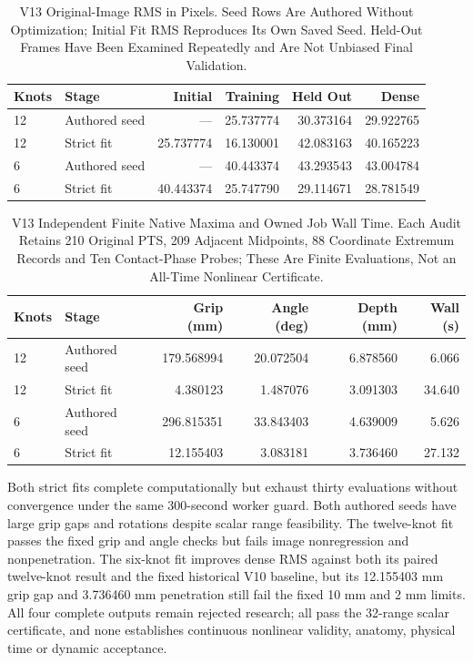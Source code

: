 \documentclass[11pt,letterpaper]{article}
\begin{document}
\begin{table}[ht]\centering\small
\begin{tabular}{@{}llrrrr@{}}
\toprule Knots & Stage & Initial & Training & Held Out & Dense\\\midrule
12 & Authored seed & --- & 25.737774 & 30.373164 & 29.922765\\
12 & Strict fit & 25.737774 & 16.130001 & 42.083163 & 40.165223\\
6 & Authored seed & --- & 40.443374 & 43.293543 & 43.004784\\
6 & Strict fit & 40.443374 & 25.747790 & 29.114671 & 28.781549\\
\bottomrule
\end{tabular}
\caption{V13 Original-Image RMS in Pixels. Seed Rows Are Authored Without
Optimization; Initial Fit RMS Reproduces Its Own Saved Seed. Held-Out Frames
Have Been Examined Repeatedly and Are Not Unbiased Final Validation.}
\end{table}

\begin{table}[ht]\centering\small
\begin{tabular}{@{}llrrrr@{}}
\toprule Knots & Stage & Grip (mm) & Angle (deg) & Depth (mm) & Wall (s)\\\midrule
12 & Authored seed & 179.568994 & 20.072504 & 6.878560 & 6.066\\
12 & Strict fit & 4.380123 & 1.487076 & 3.091303 & 34.640\\
6 & Authored seed & 296.815351 & 33.843403 & 4.639009 & 5.626\\
6 & Strict fit & 12.155403 & 3.083181 & 3.736460 & 27.132\\
\bottomrule
\end{tabular}
\caption{V13 Independent Finite Native Maxima and Owned Job Wall Time.
Each Audit Retains 210 Original PTS, 209 Adjacent Midpoints, 88 Coordinate
Extremum Records and Ten Contact-Phase Probes; These Are Finite Evaluations,
Not an All-Time Nonlinear Certificate.}
\end{table}
Both strict fits complete computationally but exhaust thirty evaluations
without convergence under the same 300-second worker guard. Both authored
seeds have large grip gaps and rotations despite scalar range feasibility.
The twelve-knot fit passes the fixed grip and angle checks but fails image
nonregression and nonpenetration. The six-knot fit improves dense RMS against
both its paired twelve-knot result and the fixed historical V10 baseline,
but its 12.155403 mm grip gap and 3.736460 mm penetration still fail the fixed
10 mm and 2 mm limits. All four complete outputs remain rejected research;
all pass the 32-range scalar certificate, and none establishes continuous
nonlinear validity, anatomy, physical time or dynamic acceptance.
\end{document}
